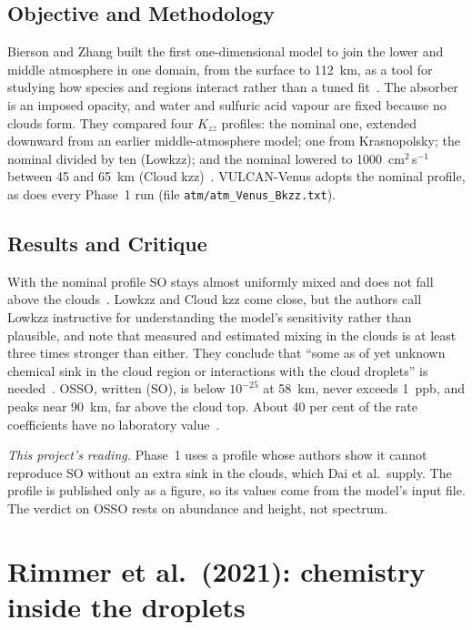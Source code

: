 \subsection{Objective and Methodology}

Bierson and Zhang built the first one-dimensional model to join the lower and middle
atmosphere in one domain, from the surface to 112~km, as a tool for studying how species
and regions interact rather than a tuned fit~\cite{bierson2020}. The absorber is an
imposed opacity, and water and sulfuric acid vapour are fixed because no clouds form.
They compared four $K_{zz}$ profiles: the nominal one, extended downward from an earlier
middle-atmosphere model; one from Krasnopolsky; the nominal divided by ten (Lowkzz); and
the nominal lowered to 1000~cm$^{2}$\,s$^{-1}$ between 45 and 65~km (Cloud
kzz)~\cite{bierson2020}. VULCAN-Venus adopts the nominal profile, as does every Phase~1
run (file \texttt{atm/atm\_Venus\_Bkzz.txt}).

\subsection{Results and Critique}

With the nominal profile SO stays almost uniformly mixed and does not fall above
the clouds~\cite{bierson2020}. Lowkzz and Cloud kzz come close, but the authors call
Lowkzz instructive for understanding the model's sensitivity rather than plausible, and
note that measured and estimated mixing in the clouds
is at least three times stronger than either. They conclude that ``some as of yet unknown
chemical sink in the cloud region or interactions with the cloud droplets'' is
needed~\cite{bierson2020}. OSSO, written (SO), is below $10^{-25}$ at 58~km, never
exceeds 1~ppb, and peaks near 90~km, far above the cloud top. About 40 per cent of the
rate coefficients have no laboratory value~\cite{bierson2020}.

\emph{This project's reading.} Phase~1 uses a profile whose authors show it cannot
reproduce SO without an extra sink in the clouds, which Dai et al.\ supply. The
profile is published only as a figure, so its values come from the model's input file.
The verdict on OSSO rests on abundance and height, not spectrum.

\section{Rimmer et al.\ (2021): chemistry inside the droplets}
\label{sec:lit-rimmer}

